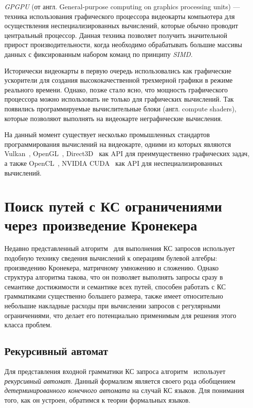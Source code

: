 \documentclass[14pt]{matmex-diploma-custom}
\begin{document}
\textit{GPGPU} (от англ. General-purpose computing on graphics processing units) --- техника использования графического процессора видеокарты компьютера для осуществления неспециализированных вычислений, которые обычно проводит центральный процессор. Данная техника позволяет получить значительной прирост производительности, когда необходимо обрабатывать большие массивы данных с фиксированным набором команд по принципу \textit{SIMD}. 

Исторически видеокарты в первую очередь использовались как графические ускорители для создания высококачественной трехмерной графики в режиме реального времени. Однако, позже стало ясно, что мощность графического процессора можно использовать не только для графических вычислений. Так появились программируемые вычислительные блоки (англ. compute shaders), которые позволяют выполнять на видеокарте неграфические вычисления.

На данный момент существует несколько промышленных стандартов программирования вычислений на видеокарте, одними из которых являются Vulkan~\cite{net:spec_vulkan}, OpenGL~\cite{net:spec_opengl}, Direct3D~\cite{net:spec_direct3d} как API для преимущественно графических задач, а также OpenCL~\cite{net:spec_opencl}, NVIDIA CUDA~\cite{net:cuda_toolkit_docs} как API для неспециализированных вычислений.

\section{Поиск путей с КС ограничениями через произведение Кронекера}

Недавно представленный алгоритм~\cite{inbook:kronecker_cfpq_adbis} для выполнения КС запросов использует подобную технику сведения вычислений к операциям булевой алгебры: произведению Кронекера, матричному умножению и сложению. Однако структура алгоритма такова, что он позволяет выполнять запросы сразу в семантике достижимости и семантике всех путей, способен работать с КС грамматиками существенно большего размера, также имеет относительно небольшие накладные расходы при вычислении запросов с регулярными ограничениями, что делает его потенциально применимым для решения этого класса проблем. 

\subsection{Рекурсивный автомат}

Для представления входной грамматики КС запроса алгоритм~\cite{inbook:kronecker_cfpq_adbis} использует \textit{рекурсивный автомат}. Данный формализм является своего рода обобщением \textit{детерминированного конечного автомата} на случай КС языков. Для понимания того, как он устроен, обратимся к теории формальных языков.
\end{document}
